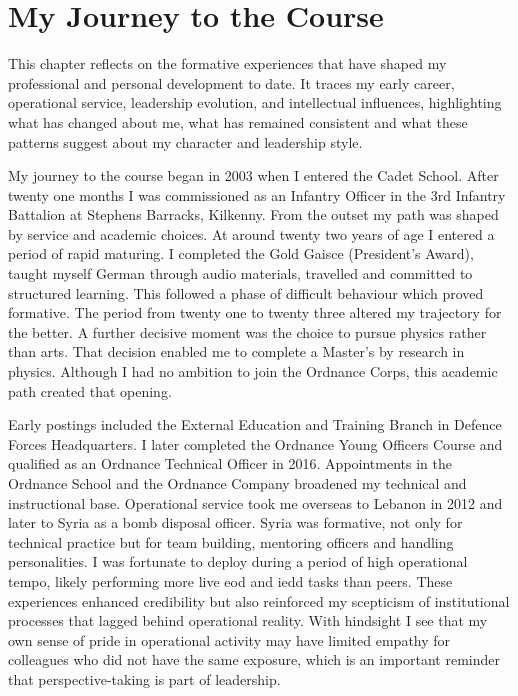 \chapter{My Journey to the Course}

This chapter reflects on the formative experiences that have shaped my professional and personal development to date. It traces my early career, operational service, leadership evolution, and intellectual influences, highlighting what has changed about me, what has remained consistent and what these patterns suggest about my character and leadership style.

My journey to the course began in 2003 when I entered the Cadet School. After twenty one months I was commissioned as an Infantry Officer in the 3rd Infantry Battalion at Stephens Barracks, Kilkenny. From the outset my path was shaped by service and academic choices. At around twenty two years of age I entered a period of rapid maturing. I completed the Gold Gaisce (President's Award), taught myself German through audio materials, travelled and committed to structured learning. This followed a phase of difficult behaviour which proved formative. The period from twenty one to twenty three altered my trajectory for the better. A further decisive moment was the choice to pursue physics rather than arts. That decision enabled me to complete a Master's by research in physics. Although I had no ambition to join the Ordnance Corps, this academic path created that opening.  

Early postings included the External Education and Training Branch in Defence Forces Headquarters. I later completed the Ordnance Young Officers Course and qualified as an Ordnance Technical Officer in 2016. Appointments in the Ordnance School and the Ordnance Company broadened my technical and instructional base. Operational service took me overseas to Lebanon in 2012 and later to Syria as a bomb disposal officer. Syria was formative, not only for technical practice but for team building, mentoring officers and handling personalities. I was fortunate to deploy during a period of high operational tempo, likely performing more live \gls{eod} and \gls{iedd} tasks than peers. These experiences enhanced credibility but also reinforced my scepticism of institutional processes that lagged behind operational reality. With hindsight I see that my own sense of pride in operational activity may have limited empathy for colleagues who did not have the same exposure, which is an important reminder that perspective-taking is part of leadership.  

